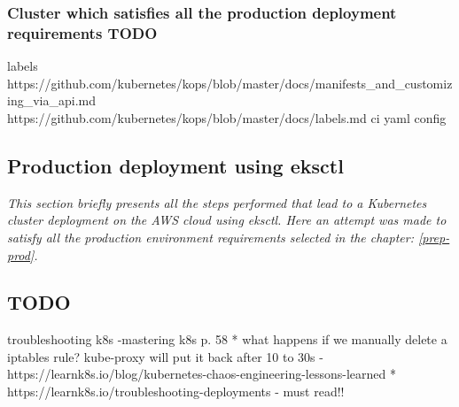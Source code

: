 \subsubsection{Cluster which satisfies all the production deployment requirements TODO}


labels https://github.com/kubernetes/kops/blob/master/docs/manifests_and_customizing_via_api.md https://github.com/kubernetes/kops/blob/master/docs/labels.md
ci yaml config

\subsection{Production deployment using eksctl}
\textit{This section briefly presents all the steps performed that lead to a Kubernetes cluster deployment on the AWS cloud using eksctl. Here an attempt was made to satisfy all the production environment requirements selected in the chapter: \ref{prep-prod}.}
\\

\subsection{TODO}

troubleshooting k8s -mastering k8s p. 58
* what happens if we manually delete a iptables rule? kube-proxy will put it back after 10 to 30s - https://learnk8s.io/blog/kubernetes-chaos-engineering-lessons-learned
* https://learnk8s.io/troubleshooting-deployments - must read!!
